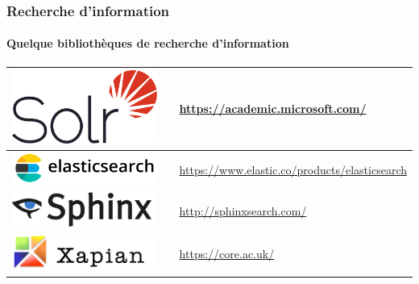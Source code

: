 \documentclass{beamer}
\begin{document}
\begin{frame}
\frametitle{Recherche d'information}
\framesubtitle{Quelque bibliothèques de recherche d'information}

\begin{tabular}{p{}cp{}}
	
	\hline
	
	\includegraphics[height=.8cm]{..//img/Bweb02-ri-gmail/solr-logo.png} &
	& 
	\url{https://academic.microsoft.com/}  \\
	
	\hline
	
	\includegraphics[height=.8cm]{..//img/Bweb02-ri-gmail/elastic-logo.png} &
	& 
	\url{https://www.elastic.co/products/elasticsearch} \\
	
	\hline
	
	\includegraphics[height=.8cm]{..//img/Bweb02-ri-gmail/sphinx-logo.png} & 
	& 
	\url{http://sphinxsearch.com/} \\
	
	\hline
	
	\includegraphics[height=.8cm]{..//img/Bweb02-ri-gmail/xapian-logo.png} & 
	& 
	\url{https://core.ac.uk/} \\
	
	\hline
	
\end{tabular}


\end{frame}
\end{document}
